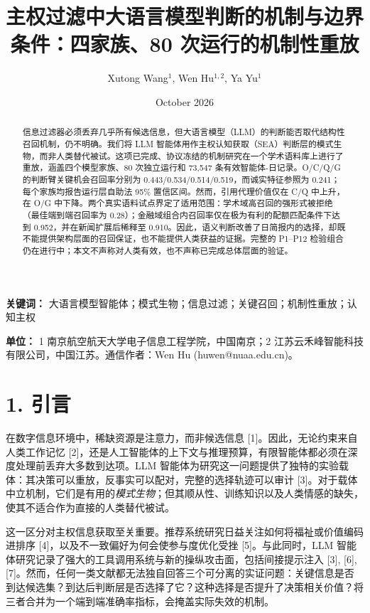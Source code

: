 \documentclass[
  chinese,
  conference,10pt]{IEEEtran}
\title{主权过滤中大语言模型判断的机制与边界条件：四家族、80 次运行的机制性重放}
\author{Xutong Wang\(^{1}\), Wen Hu\(^{1,2}\), Ya Yu\(^{1}\)}
\date{October 2026}
\begin{document}
\maketitle
\begin{abstract}
信息过滤器必须丢弃几乎所有候选信息，但大语言模型（LLM）的判断能否取代结构性召回机制，仍不明确。我们将 LLM 智能体用作主权认知获取（SEA）判断层的模式生物，而非人类替代被试。这项已完成、协议冻结的机制研究在一个学术语料库上进行了重放，涵盖四个模型家族、80 次独立运行和 73,547 条有效智能体-日记录。O/C/Q/G 的判断臂关键机会召回率分别为 0.443/0.534/0.514/0.519，而诚实特征参照为 0.241；每个家族均报告运行层自助法 95\% 置信区间。然而，引用代理价值仅在 C/Q 中上升，在 O/G 中下降。两个真实语料试点界定了适用范围：学术域高召回的强形式被拒绝（最佳端到端召回率为 0.28）；金融域组合内召回率仅在极为有利的配额匹配条件下达到 0.952，并在新闻扩展后稀释至 0.910。因此，语义判断改善了日简报内的选择，却既不能提供架构层面的召回保证，也不能提供人类获益的证据。完整的 P1--P12 检验组合仍在进行中；本文不声称对人类有效，也不声称已完成总体层面的验证。
\end{abstract}

\textbf{关键词：} 大语言模型智能体；模式生物；信息过滤；关键召回；机制性重放；认知主权

\textbf{单位：} 1 南京航空航天大学电子信息工程学院，中国南京；2 江苏云禾峰智能科技有限公司，中国江苏。通信作者：Wen Hu (huwen@nuaa.edu.cn)。

\section{1. 引言}\label{ux5f15ux8a00}

在数字信息环境中，稀缺资源是注意力，而非候选信息 {[}1{]}。因此，无论约束来自人类工作记忆 {[}2{]}，还是人工智能体的上下文与推理预算，有限智能体都必须在深度处理前丢弃大多数到达项。LLM 智能体为研究这一问题提供了独特的实验载体：其决策可以重放，反事实可以配对，完整的选择轨迹可以审计 {[}3{]}。对于载体中立机制，它们是有用的\emph{模式生物}；但其顺从性、训练知识以及人类情感的缺失，使其不适合作为直接的人类替代被试。

这一区分对主权信息获取至关重要。推荐系统研究日益关注如何将福祉或价值编码进排序 {[}4{]}，以及不一致偏好为何会使参与度优化受挫 {[}5{]}。与此同时，LLM 智能体研究记录了强大的工具调用系统与新的操纵攻击面，包括间接提示注入 {[}3{]}, {[}6{]}, {[}7{]}。然而，任何一类文献都无法独自回答三个可分离的实证问题：关键信息是否到达候选集？到达后判断层是否选择了它？这种选择是否提升了决策相关价值？将三者合并为一个端到端准确率指标，会掩盖实际失效的机制。
\end{document}
